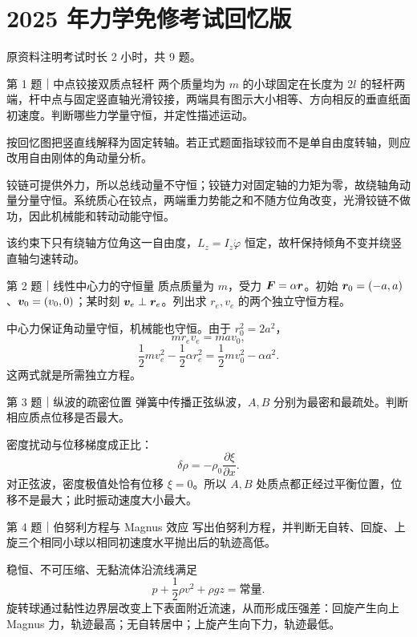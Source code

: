 \chapter{2025 年力学免修考试回忆版}
\noindent{}\quad{}\qquad 原资料注明考试时长 2 小时，共 9 题。

\begin{problem}{第 1 题｜中点铰接双质点轻杆}
两个质量均为 $m$ 的小球固定在长度为 $2l$ 的轻杆两端，杆中点与固定竖直轴光滑铰接，两端具有图示大小相等、方向相反的垂直纸面初速度。判断哪些力学量守恒，并定性描述运动。
\FigHingedRod
\end{problem}
\begin{identification}
按回忆图把竖直线解释为固定转轴。若正式题面指球铰而不是单自由度转轴，则应改用自由刚体的角动量分析。
\end{identification}
\begin{solution}
铰链可提供外力，所以总线动量不守恒；铰链力对固定轴的力矩为零，故绕轴角动量分量守恒。系统质心在铰点，两端重力势能之和不随方位角改变，光滑铰链不做功，因此机械能和转动动能守恒。

该约束下只有绕轴方位角这一自由度，$L_z=I_z\dot\varphi$ 恒定，故杆保持倾角不变并绕竖直轴匀速转动。
\end{solution}

\begin{problem}{第 2 题｜线性中心力的守恒量}
质点质量为 $m$，受力 $\bm{F}=\alpha\bm{r}$。初始 $\bm{r}_0=(-a,a)$、$\bm{v}_0=(v_0,0)$；某时刻 $\bm{v}_e\perp\bm{r}_e$。列出求 $r_e,v_e$ 的两个独立守恒方程。
\end{problem}
\begin{solution}
中心力保证角动量守恒，机械能也守恒。由于 $r_0^2=2a^2$，
\[
mr_ev_e=ma v_0,
\]
\[
\frac12mv_e^2-\frac12\alpha r_e^2
=\frac12mv_0^2-\alpha a^2.
\]
这两式就是所需独立方程。
\end{solution}

\begin{problem}{第 3 题｜纵波的疏密位置}
弹簧中传播正弦纵波，$A,B$ 分别为最密和最疏处。判断相应质点位移是否最大。
\FigLongWave
\end{problem}
\begin{solution}
密度扰动与位移梯度成正比：
\[
\delta\rho=-\rho_0\frac{\partial\xi}{\partial x}.
\]
对正弦波，密度极值处恰有位移 $\xi=0$。所以 $A,B$ 处质点都正经过平衡位置，位移不是最大；此时振动速度大小最大。
\end{solution}

\begin{problem}{第 4 题｜伯努利方程与 Magnus 效应}
写出伯努利方程，并判断无自转、回旋、上旋三个相同小球以相同初速度水平抛出后的轨迹高低。
\FigMagnus
\end{problem}
\begin{solution}
稳恒、不可压缩、无黏流体沿流线满足
\[
p+\frac12\rho v^2+\rho gz=\text{常量}.
\]
旋转球通过黏性边界层改变上下表面附近流速，从而形成压强差：回旋产生向上 Magnus 力，轨迹最高；无自转居中；上旋产生向下力，轨迹最低。
\end{solution}

